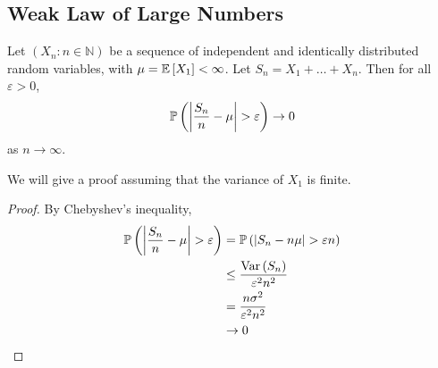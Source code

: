\subsection{Weak Law of Large Numbers}
\begin{theorem}
	Let $(X_n \colon n \in \mathbb N)$ be a sequence of independent and identically distributed random variables, with $\mu = \mathbb{E}\left[{X_1}\right] < \infty$. Let $S_n = X_1 + \dots + X_n$. Then for all $\varepsilon > 0$,
	\[ \mathbb{P}\left({\abs{\frac{S_n}{n} - \mu} > \varepsilon}\right) \to 0 \]
	as $n \to \infty$.
\end{theorem}
\noindent We will give a proof assuming that the variance of $X_1$ is finite.
\begin{proof}
	By Chebyshev's inequality,
	\begin{align*}
		\mathbb{P}\left({\abs{\frac{S_n}{n} - \mu} > \varepsilon}\right) & = \mathbb{P}\left({\abs{S_n - n\mu} > \varepsilon n}\right) \\
		                                               & \leq \frac{\operatorname{Var}\left({S_n}\right)}{\varepsilon^2 n^2}  \\
		                                               & = \frac{n\sigma^2}{\varepsilon^2 n^2}     \\
		                                               & \to 0
	\end{align*}
\end{proof}
